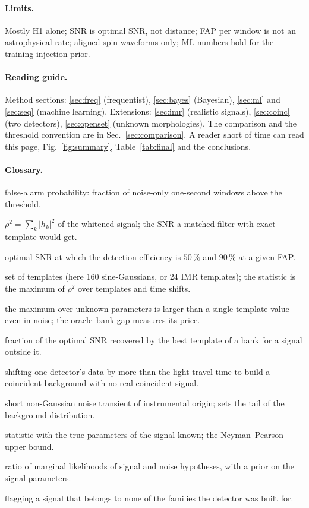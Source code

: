 \paragraph{Limits.} Mostly H1 alone; SNR is optimal SNR, not distance; FAP per window is not an astrophysical rate; aligned-spin waveforms only; ML numbers hold for the training injection prior.

\paragraph{Reading guide.} Method sections: \ref{sec:freq} (frequentist), \ref{sec:bayes} (Bayesian), \ref{sec:ml} and \ref{sec:seq} (machine learning). Extensions: \ref{sec:imr} (realistic signals), \ref{sec:coinc} (two detectors), \ref{sec:openset} (unknown morphologies). The comparison and the threshold convention are in Sec.~\ref{sec:comparison}. A reader short of time can read this page, Fig.~\ref{fig:summary}, Table~\ref{tab:final} and the conclusions.

\paragraph{Glossary.}
\begin{description}[nosep,leftmargin=1.2em,labelindent=0pt]
\item[FAP] false-alarm probability: fraction of noise-only one-second windows above the threshold.
\item[$\snr$, optimal SNR] $\rho^2=\sum_k|h_k|^2$ of the whitened signal; the SNR a matched filter with exact template would get.
\item[$\snr_{50}$, $\snr_{90}$] optimal SNR at which the detection efficiency is $50\,\%$ and $90\,\%$ at a given FAP.
\item[Matched-filter bank] set of templates (here 160 sine-Gaussians, or 24 IMR templates); the statistic is the maximum of $\rho^2$ over templates and time shifts.
\item[Look-elsewhere effect] the maximum over unknown parameters is larger than a single-template value even in noise; the oracle--bank gap measures its price.
\item[Fitting factor] fraction of the optimal SNR recovered by the best template of a bank for a signal outside it.
\item[Time slides] shifting one detector's data by more than the light travel time to build a coincident background with no real coincident signal.
\item[Glitch] short non-Gaussian noise transient of instrumental origin; sets the tail of the background distribution.
\item[Oracle] statistic with the true parameters of the signal known; the Neyman--Pearson upper bound.
\item[Bayes factor] ratio of marginal likelihoods of signal and noise hypotheses, with a prior on the signal parameters.
\item[Open set] flagging a signal that belongs to none of the families the detector was built for.
\end{description}
